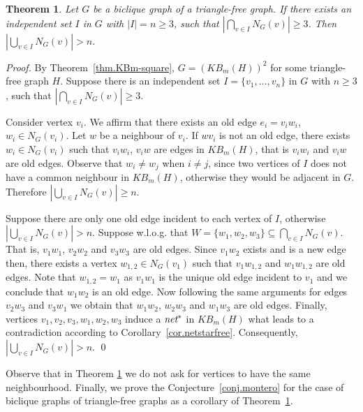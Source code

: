 \documentclass{article}
\newcommand{\net}{\emph{net}}
\newtheorem{theorem}{Theorem}
\begin{document}
\begin{theorem}\label{thm.independent}
  Let $G$ be a biclique graph of a triangle-free graph.  If there exists
  an  independent set  $I$ in  $G$  with $|I|  =  n \geq  3$, such  that
  $|\bigcap_{v      \in     I}      N_G(v)|      \geq     3$.       Then
  $|\bigcup_{v \in I} N_G(v)| > n$.
\end{theorem}
\begin{proof} 
  By    Theorem~\ref{thm.KBm-square},     $G=(KB_m(H))^2$    for    some
  triangle-free  graph  $H$.   Suppose   there  is  an  independent  set
  $I  =  \{v_1,  \ldots, v_n\}$  in  $G$  with  $n  \geq 3$,  such  that
  $|\bigcap_{v \in I} N_G(v)| \geq 3$.

  Consider  vertex $v_i$.   We  affirm  that there  exists  an old  edge
  $e_i=v_iw_i$, $w_i \in N_G(v_i)$. Let $w$ be a neighbour of $v_i$.  If
  $wv_i$ is not  an old edge, there exists $w_i  \in N_G(v_i)$ such that
  $v_iw_i$, $v_iw$ are  edges in $KB_m(H)$, that is  $v_iw_i$ and $v_iw$
  are old edges.  Observe that $w_i \neq w_j$ when $i \neq j$, since two
  vertices  of  $I$ does  not  have  a  common neighbour  in  $KB_m(H)$,
  otherwise    they   would    be    adjacent    in   $G$.     Therefore
  $|\bigcup_{v \in I} N_G(v)| \geq n$.

  Suppose  there are  only one  old edge  incident to  each vertex  of $I$,
  otherwise $|\bigcup_{v \in I} N_G(v)| > n$.
%  
  Suppose                         w.l.o.g.                          that
  $W =  \{w_1, w_2, w_3\} \subseteq  \bigcap_{v \in I} N_G(v)$.   That is,
  $v_1w_1$, $v_2w_2$ and $v_3w_3$ are  old edges.  Since $v_1w_2$ exists
  and is  a new edge  then, there exists  a vertex $w_{1,2}  \in N_G(v_1)$
  such  that $v_1w_{1,2}$  and  $w_1w_{1,2}$ are  old  edges. Note  that
  $w_{1,2} = w_1$  as $v_1w_1$ is the unique old  edge incident to $v_1$
  and we conclude that $w_1w_2$ is an old edge.  Now following the same
  arguments for 
  edges $v_2w_3$ and $v_3w_1$  we obtain that
  $w_1w_2$,  $w_2w_3$ and  $w_1w_3$  are old  edges.  Finally,  vertices
  $v_1,v_2,v_3,w_1,w_2,w_3$ induce a $\net^*$ in $KB_m(H)$ what leads to
  a contradiction according to Corollary~\ref{cor.netstarfree}.
%
  Consequently, $|\bigcup_{v \in I} N_G(v)| > n$.
%
  \qed
\end{proof}

Observe that in Theorem \ref{thm.independent} we do not ask for vertices to have the same neighbourhood. 
Finally, we prove the Conjecture~\ref{conj.montero}  for the case of biclique
graphs    of    triangle-free    graphs    as    a   corollary    of
Theorem~\ref{thm.independent}.
\end{document}
